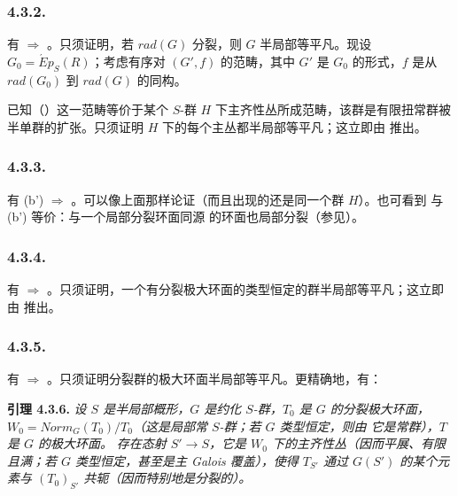 \subsubsection*{4.3.2.}
有  \(\Rightarrow\) 。只须证明，若 \(rad(G)\) 分裂，则 \(G\) 半局部等平凡。现设 \(G_{0} =\acute{E}p_{S}(R)\)；考虑有序对 \((G',f)\) 的范畴，其中 \(G'\) 是 \(G_0\) 的形式，\(f\) 是从 \(rad(G_{0})\) 到 \(rad(G)\) 的同构。

已知（）这一范畴等价于某个 \(S\)-群 \(H\) 下主齐性丛所成范畴，该群是有限扭常群被半单群的扩张。只须证明 \(H\) 下的每个主丛都半局部等平凡；这立即由  推出。

\subsubsection*{4.3.3.}
有 (b') \(\Rightarrow\) 。可以像上面那样论证（而且出现的还是同一个群 \(H\)）。也可看到  与 (b') 等价：与一个局部分裂环面同源 的环面也局部分裂（参见）。

\subsubsection*{4.3.4.}
有  \(\Rightarrow\) 。只须证明，一个有分裂极大环面的类型恒定的群半局部等平凡；这立即由  推出。

\subsubsection*{4.3.5.}
有  \(\Rightarrow\) 。只须证明分裂群的极大环面半局部等平凡。更精确地，有：

\textbf{引理 4.3.6.} \emph{设 \(S\) 是半局部概形，\(G\) 是约化 \(S\)-群，\(T_0\) 是 \(G\) 的分裂极大环面，\(W_{0}= Norm_{G}(T_{0}) / T_{0}\)（这是局部常 \(S\)-群；若 \(G\) 类型恒定，则由  它是常群），\(T\) 是 \(G\) 的极大环面。}
\emph{存在态射 \(S' \to S\)，它是 \(W_0\) 下的主齐性丛（因而平展、有限且满；若 \(G\) 类型恒定，甚至是主 Galois 覆盖），使得 \(T_{S'}\) 通过 \(G(S')\) 的某个元素与 \((T_{0})_{S'}\) 共轭（因而特别地是分裂的）。}

